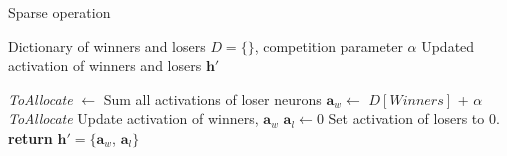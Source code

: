 %
%
%
%
%

\begin{algorithm}
    \caption{Sparse operation}
    \label{algo:sparse}
    \begin{algorithmic}[1]
    
    \INPUT Dictionary of winners and losers $D = \{\}$, competition parameter $\alpha$
    \OUTPUT Updated activation of winners and losers $\mathbf{h}'$

    \item[]
    \State \textit{ToAllocate} $\gets$ 
    \Comment Sum all activations of loser neurons
    \State $\mathbf{a}_{w} \gets$ $D[Winners]$ + $\alpha$ \textit{ToAllocate}
    \Comment Update activation of winners, $\mathbf{a}_{w}$
    \State $\mathbf{a}_{l} \gets 0$ 
    \Comment Set activation of losers to $0$.
    \State \textbf{return} $\mathbf{h}' = \{\mathbf{a}_{w}$, $\mathbf{a}_{l}\}$
    \end{algorithmic}
\end{algorithm}
